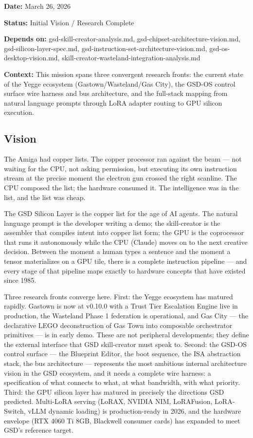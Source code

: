 \documentclass[11pt,letterpaper]{article}
\newcommand{\metafield}[2]{\textbf{\sffamily #1} #2\par}
\begin{document}
\metafield{Date:}{March 26, 2026}
\metafield{Status:}{Initial Vision / Research Complete}
\metafield{Depends on:}{gsd-skill-creator-analysis.md, gsd-chipset-architecture-vision.md, gsd-silicon-layer-spec.md, gsd-instruction-set-architecture-vision.md, gsd-os-desktop-vision.md, skill-creator-wasteland-integration-analysis.md}
\metafield{Context:}{This mission spans three convergent research fronts: the current state of the Yegge ecosystem (Gastown/Wasteland/Gas City), the GSD-OS control surface wire harness and bus architecture, and the full-stack mapping from natural language prompts through LoRA adapter routing to GPU silicon execution.}

\subsection{Vision}

The Amiga had copper lists. The copper processor ran against the beam --- not waiting for the CPU, not asking permission, but executing its own instruction stream at the precise moment the electron gun crossed the right scanline. The CPU composed the list; the hardware consumed it. The intelligence was in the list, and the list was cheap.

The GSD Silicon Layer is the copper list for the age of AI agents. The natural language prompt is the developer writing a demo; the skill-creator is the assembler that compiles intent into copper list form; the GPU is the coprocessor that runs it autonomously while the CPU (Claude) moves on to the next creative decision. Between the moment a human types a sentence and the moment a tensor materializes on a GPU tile, there is a complete instruction pipeline --- and every stage of that pipeline maps exactly to hardware concepts that have existed since 1985.

Three research fronts converge here. First: the Yegge ecosystem has matured rapidly. Gastown is now at v0.10.0 with a Trust Tier Escalation Engine live in production, the Wasteland Phase 1 federation is operational, and Gas City --- the declarative LEGO deconstruction of Gas Town into composable orchestrator primitives --- is in early demo. These are not peripheral developments; they define the external interface that GSD skill-creator must speak to. Second: the GSD-OS control surface --- the Blueprint Editor, the boot sequence, the ISA abstraction stack, the bus architecture --- represents the most ambitious internal architecture vision in the GSD ecosystem, and it needs a complete wire harness: a specification of what connects to what, at what bandwidth, with what priority. Third: the GPU silicon layer has matured in precisely the directions GSD predicted. Multi-LoRA serving (LoRAX, NVIDIA NIM, LoRAFusion, LoRA-Switch, vLLM dynamic loading) is production-ready in 2026, and the hardware envelope (RTX 4060 Ti 8GB, Blackwell consumer cards) has expanded to meet GSD's reference target.
\end{document}
